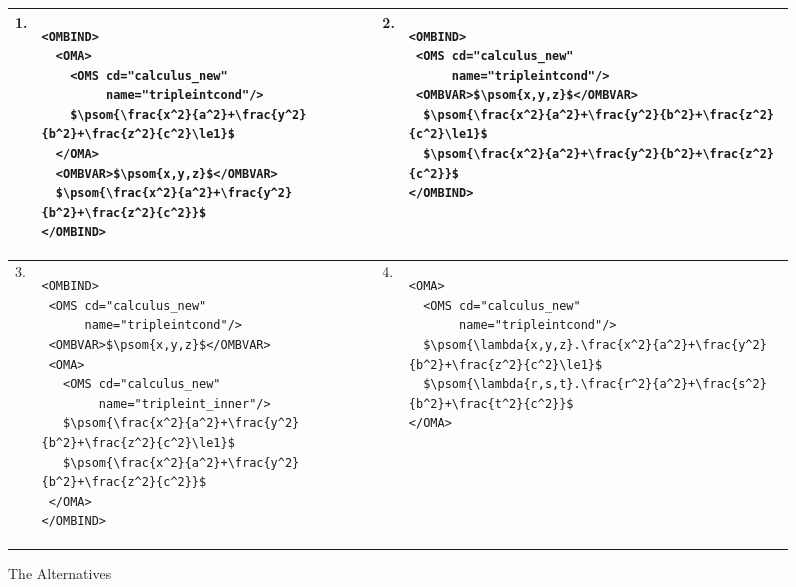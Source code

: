 \documentclass{llncs}
\begin{document}
\begin{figure}\centering\vspace*{-.8cm}
\lstset{mathescape,numbers=none,frame=none,aboveskip=-.7em,belowskip=-1.2em}
  \begin{tabular}{|l|p{5.2cm}||l|p{5.2cm}|}\hline
    1.&
\begin{lstlisting}
<OMBIND>
  <OMA>
    <OMS cd="calculus_new" 
         name="tripleintcond"/>
    $\psom{\frac{x^2}{a^2}+\frac{y^2}{b^2}+\frac{z^2}{c^2}\le1}$
  </OMA>
  <OMBVAR>$\psom{x,y,z}$</OMBVAR>
  $\psom{\frac{x^2}{a^2}+\frac{y^2}{b^2}+\frac{z^2}{c^2}}$
</OMBIND>
\end{lstlisting}
& 2. & 
\begin{lstlisting}
<OMBIND>
 <OMS cd="calculus_new" 
      name="tripleintcond"/>
 <OMBVAR>$\psom{x,y,z}$</OMBVAR>
  $\psom{\frac{x^2}{a^2}+\frac{y^2}{b^2}+\frac{z^2}{c^2}\le1}$
  $\psom{\frac{x^2}{a^2}+\frac{y^2}{b^2}+\frac{z^2}{c^2}}$
</OMBIND>
\end{lstlisting}
\\\hline
3. & 
\begin{lstlisting}
<OMBIND>
 <OMS cd="calculus_new" 
      name="tripleintcond"/>
 <OMBVAR>$\psom{x,y,z}$</OMBVAR>
 <OMA>
   <OMS cd="calculus_new" 
        name="tripleint_inner"/>
   $\psom{\frac{x^2}{a^2}+\frac{y^2}{b^2}+\frac{z^2}{c^2}\le1}$
   $\psom{\frac{x^2}{a^2}+\frac{y^2}{b^2}+\frac{z^2}{c^2}}$
 </OMA>
</OMBIND>
\end{lstlisting}
& 4. & 
\begin{lstlisting}
<OMA>
  <OMS cd="calculus_new" 
       name="tripleintcond"/>
  $\psom{\lambda{x,y,z}.\frac{x^2}{a^2}+\frac{y^2}{b^2}+\frac{z^2}{c^2}\le1}$
  $\psom{\lambda{r,s,t}.\frac{r^2}{a^2}+\frac{s^2}{b^2}+\frac{t^2}{c^2}}$
</OMA>
\end{lstlisting}
\\\hline
\end{tabular}
\caption{The Alternatives}\label{fig:alternatives}\vspace*{-2em}
\end{figure}
\end{document}
